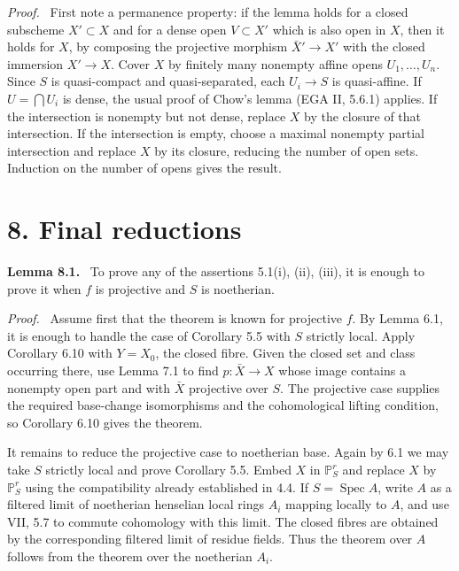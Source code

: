 \documentclass[12pt]{article}
\newcommand{\Spec}{\operatorname{Spec}}
\newenvironment{statement}[1]{\par\medskip\noindent\textbf{#1.}\ }{\par\medskip}
\newenvironment{prooftext}[1][Proof]{\par\noindent\emph{#1.}\ }{\par\medskip}
\begin{document}
\begin{prooftext}
First note a permanence property: if the lemma holds for a closed subscheme \(X'\subset X\) and for a dense open \(V\subset X'\) which is also open in \(X\), then it holds for \(X\), by composing the projective morphism \(\bar X'\to X'\) with the closed immersion \(X'\to X\). Cover \(X\) by finitely many nonempty affine opens \(U_1,
\ldots,U_n\). Since \(S\) is quasi-compact and quasi-separated, each \(U_i\to S\) is quasi-affine. If \(U=\bigcap U_i\) is dense, the usual proof of Chow's lemma (EGA II, 5.6.1) applies. If the intersection is nonempty but not dense, replace \(X\) by the closure of that intersection. If the intersection is empty, choose a maximal nonempty partial intersection and replace \(X\) by its closure, reducing the number of open sets. Induction on the number of opens gives the result.
\end{prooftext}

\section*{8. Final reductions}

\begin{statement}{Lemma 8.1}
To prove any of the assertions 5.1(i), (ii), (iii), it is enough to prove it when \(f\) is projective and \(S\) is noetherian.
\end{statement}

\begin{prooftext}
Assume first that the theorem is known for projective \(f\). By Lemma 6.1, it is enough to handle the case of Corollary 5.5 with \(S\) strictly local. Apply Corollary 6.10 with \(Y=X_0\), the closed fibre. Given the closed set and class occurring there, use Lemma 7.1 to find \(p:\bar X\to X\) whose image contains a nonempty open part and with \(\bar X\) projective over \(S\). The projective case supplies the required base-change isomorphisms and the cohomological lifting condition, so Corollary 6.10 gives the theorem.

It remains to reduce the projective case to noetherian base. Again by 6.1 we may take \(S\) strictly local and prove Corollary 5.5. Embed \(X\) in \(\mathbb P^r_S\) and replace \(X\) by \(\mathbb P^r_S\) using the compatibility already established in 4.4. If \(S=\Spec A\), write \(A\) as a filtered limit of noetherian henselian local rings \(A_i\) mapping locally to \(A\), and use VII, 5.7 to commute cohomology with this limit. The closed fibres are obtained by the corresponding filtered limit of residue fields. Thus the theorem over \(A\) follows from the theorem over the noetherian \(A_i\).
\end{prooftext}
\end{document}

